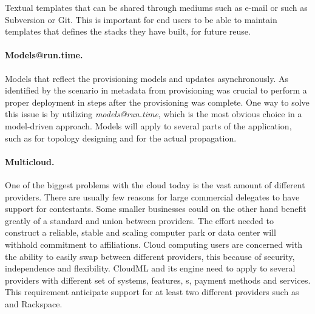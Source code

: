 Textual templates that can be shared through mediums such as e-mail or 
 such as Subversion or Git.
This is important for end users to be able to maintain templates that defines the stacks they have built, for future reuse.

\paragraph{Models@run.time.}
Models that reflect the provisioning models and updates asynchronously. 
As identified by the scenario in  metadata from provisioning was crucial to perform
a proper deployment in steps after the provisioning was complete.
One way to solve this issue is by utilizing \emph{models@run.time}, which is the most obvious choice in a
model-driven approach.
Models will apply to several parts of the application, such as for topology designing and for the actual propagation.

\paragraph{Multicloud.}
One of the biggest problems with the cloud today is the vast amount of different providers. 
There are usually few reasons for large commercial delegates to have support for contestants. 
Some smaller businesses could on the other hand benefit greatly of a standard and union 
between providers.
The effort needed to construct a reliable, stable and scaling computer park or data center will 
withhold commitment to affiliations. 
Cloud computing users are concerned with the ability to easily swap between different providers, 
this because of security, 
independence and flexibility. 
CloudML and its engine need to apply to several providers with different set of systems, 
features, s, payment methods and services. This requirement anticipate support for at least two different providers such as  and Rackspace.
